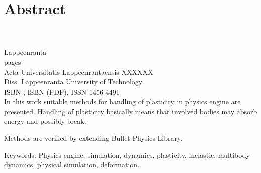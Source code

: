 \section*{Abstract}

\textbf{\myname}\\
\textbf{\mytitle}\\
Lappeenranta \myyear\\
\pageref{LastPage} pages\\
Acta Universitatis Lappeenrantaensis XXXXXX\\
Diss. Lappeenranta University of Technology\\
ISBN \myisbn, ISBN \mypdfisbn (PDF), ISSN 1456-4491\\

In this work suitable methods for handling of plasticity in physics engine are presented.
Handling of plasticity basically means that involved bodies may absorb energy and possibly break.

Methods are verified by extending Bullet Physics Library. 

Keywords: Physics engine, simulation, dynamics, plasticity, inelastic, multibody dynamics,  physical simulation, deformation.

